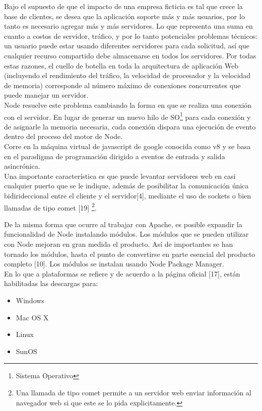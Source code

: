 Bajo el supuesto de que el impacto de una empresa ficticia es tal que crece la base de clientes, se desea 
que la aplicación soporte más y más usuarios, por lo tanto es necesario agregar más y más servidores.
Lo que representa una suma en cuanto a costos de servidor, tráfico, y por lo tanto potenciales
problemas técnicos: un usuario puede estar usando diferentes servidores para cada solicitud, así que cualquier 
recurso compartido debe almacenarse en todos los servidores. Por todas estas razones, el cuello de botella en 
toda la arquitectura de aplicación Web (incluyendo el rendimiento del tráfico, la velocidad de procesador y la 
velocidad de memoria) corresponde al número máximo de conexiones concurrentes que puede manejar un servidor.\\

Node resuelve este problema cambiando la forma en que se realiza una conexión con el servidor. En lugar de 
generar un nuevo hilo de SO\footnote{Sistema Operativo} para cada conexión y de asignarle la memoria necesaria, 
cada conexión dispara una ejecución de evento dentro del proceso del motor de Node.\\

Corre en la máquina virtual de javascript de google conocida como v8 y se basa en el paradigma
de programación dirigido a eventos de entrada y salida asincrónica.\\

Una importante característica es que puede levantar servidores web en casi cualquier puerto que se 
le indique, además de posibilitar la comunicación única bidirideccional entre el cliente y el servidor[4],
mediante el uso de sockets o bien llamadas de tipo comet [19] \footnote{Una llamada de tipo comet 
permite a un servidor web enviar información al navegador web si que este se lo pida explicitamente.}.


De la misma forma que ocurre al trabajar con Apache, es posible expandir la funcionalidad de Node 
instalando módulos. Los módulos que se pueden utilizar con Node mejoran en gran medida el producto.
Así de importantes se han tornado los módulos, hasta el punto de convertirse en parte esencial del 
producto completo [10]. Los módulos se instalan usando Node Package Manager.\\

En lo que a plataformas se refiere y de acuerdo a la página oficial [17], están habilitadas las 
descargas para:
\begin{itemize}
 \item Windows
 \item Mac OS X
 \item Linux
 \item SunOS
\end{itemize}


